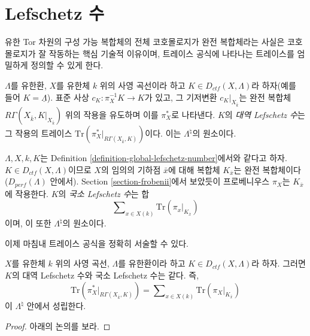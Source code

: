 \section{Lefschetz 수}
\label{section-lefschetz-numbers}

\noindent
유한 Tor 차원의 구성 가능 복합체의 전체 코호몰로지가 완전
복합체라는 사실은 코호몰로지가 잘 작동하는 핵심 기술적 이유이며,
트레이스 공식에 나타나는 트레이스를 엄밀하게 정의할 수 있게 한다.

\begin{definition}
\label{definition-global-lefschetz-number}
$\Lambda$를 유한환, $X$를 유한체 $k$ 위의 사영 곡선이라 하고
$K \in D_{ctf}(X, \Lambda)$라 하자(예를 들어
$K = \underline\Lambda$). 표준 사상
$c_K : \pi_X^{-1}K \to K$가 있고, 그 기저변환
$c_K|_{X_{\bar k}}$는 완전 복합체
$R\Gamma(X_{\bar k}, K|_{X_{\bar k}})$ 위의 작용을 유도하며 이를
$\pi_X^*$로 나타낸다. $K$의 {\it 대역 Lefschetz 수}는 그 작용의
트레이스 $\text{Tr}(\pi_X^* |_{R\Gamma(X_{\bar k}, K)})$이다.
이는 $\Lambda^\natural$의 원소이다.
\end{definition}

\begin{definition}
\label{definition-local-lefschetz-number}
$\Lambda, X, k, K$는 Definition
\ref{definition-global-lefschetz-number}에서와 같다고 하자.
$K\in D_{ctf}(X, \Lambda)$이므로 $X$의 임의의 기하점 $\bar x$에
대해 복합체 $K_{\bar x}$는 완전 복합체이다
($D_{perf}(\Lambda)$ 안에서). Section \ref{section-frobenii}에서
보았듯이 프로베니우스 $\pi_X$는 $K_{\bar x}$에 작용한다.
$K$의 {\it 국소 Lefschetz 수}는 합
$$
\sum\nolimits_{x\in X(k)} \text{Tr}(\pi_x |_{K_{\overline{x}}})
$$
이며, 이 또한 $\Lambda^\natural$의 원소이다.
\end{definition}

\noindent
이제 마침내 트레이스 공식을 정확히 서술할 수 있다.

\begin{theorem}
\label{theorem-trace}
$X$를 유한체 $k$ 위의 사영 곡선, $\Lambda$를 유한환이라 하고
$K \in D_{ctf}(X, \Lambda)$라 하자. 그러면 $K$의 대역 Lefschetz
수와 국소 Lefschetz 수는 같다. 즉,
\begin{equation}
\label{equation-trace-formula}
\text{Tr}(\pi^*_X |_{R\Gamma(X_{\bar k}, K)})
=
\sum\nolimits_{x\in X(k)} \text{Tr}(\pi_X |_{K_{\bar x}})
\end{equation}
이 $\Lambda^\natural$ 안에서 성립한다.
\end{theorem}

\begin{proof}
아래의 논의를 보라.
\end{proof}

